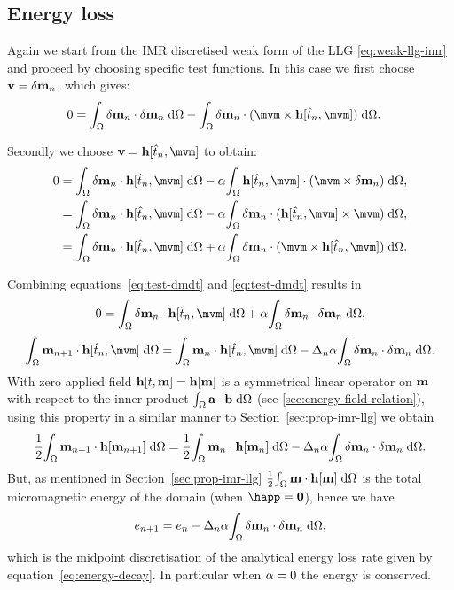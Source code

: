 \subsection{Energy loss}

Again we start from the IMR discretised weak form of the LLG \eqref{eq:weak-llg-imr} and proceed by choosing specific test functions.
In this case we first choose $\mathbf{v} = \delta \mathbf{m}_n$, which gives:
\begin{equation}
  \label{eq:test-dmdt}
  \begin{aligned}
    0 &= \intd{\dmdtm \cdot \dmdtm} - \intd{\dmdtm  \cdot (\mvm \times \hv[\tm, \mvm])}.
  \end{aligned}
\end{equation}

Secondly we choose $\testv = \hv[\tm, \mvm]$ to obtain:
\begin{equation}
  \label{eq:test-h}
  \begin{aligned}
    0 &= \intd{\dmdtm \cdot \hv[\tm, \mvm]} - \dampc \intd{\hv[\tm, \mvm] \cdot (\mvm \times \dmdtm)}, \\
    & = \intd{\dmdtm \cdot \hv[\tm, \mvm]} - \dampc \intd{\dmdtm \cdot (\hv[\tm, \mvm] \times \mvm)}, \\
    & = \intd{\dmdtm \cdot \hv[\tm, \mvm]} + \dampc \intd{\dmdtm \cdot (\mvm \times \hv[\tm, \mvm])}.
  \end{aligned}
\end{equation}

Combining equations~\eqref{eq:test-dmdt} and \eqref{eq:test-dmdt} results in
\begin{equation}
  0 = \intd{\dmdtm \cdot \hv[\tm, \mvm]} + \dampc \intd{\dmdtm \cdot \dmdtm},
\end{equation}
\ie
\begin{equation}
  \intd{\mv_{n+1} \cdot \hv[\tm, \mvm]} = \intd{\mv_n \cdot \hv[\tm, \mvm]} - \dtn \dampc \intd{\dmdtm \cdot \dmdtm}.
\end{equation}
With zero applied field $\mathbf{h}[t, \mathbf{m}] = \mathbf{h}[\mathbf{m}]$ is a symmetrical linear operator on $\mathbf{m}$ with respect to the inner product ${\int_{\Omega} {\mathbf{a}} \cdot {\mathbf{b}} {\; \text{d}} {\Omega}}$ (see \autoref{sec:energy-field-relation}), using this property in a similar manner to Section~\ref{sec:prop-imr-llg} we obtain
\begin{equation}
  \frac{1}{2}{\int_{\Omega} \mathbf{m}_{n+1} \cdot \mathbf{h}[\mathbf{m}_{n+1}] {\; \text{d}} {\Omega}} = \frac{1}{2}{\int_{\Omega} \mathbf{m}_n \cdot \mathbf{h}[\mathbf{m}_n] {\; \text{d}} {\Omega}} - \Delta_{n} \alpha {\int_{\Omega} \delta\mathbf{m}_n\cdot \delta\mathbf{m}_n{\; \text{d}}{\Omega}}.
\end{equation}
But, as mentioned in Section~\ref{sec:prop-imr-llg} $\frac{1}{2}{\int_{\Omega} \mathbf{m} \cdot \mathbf{h}[\mathbf{m}] {\; \text{d}} {\Omega}}$ is the total micromagnetic energy of the domain (when $\happ = \zerov$), hence we have
\begin{equation}
  e_{n+1} = e_n - \Delta_{n} \alpha {\int_{\Omega} \delta\mathbf{m}_n\cdot \delta\mathbf{m}_n{\; \text{d}}{\Omega}},
\end{equation}
which is the midpoint discretisation of the analytical energy loss rate given by equation~\eqref{eq:energy-decay}.
In particular when $\alpha = 0$ the energy is conserved.

